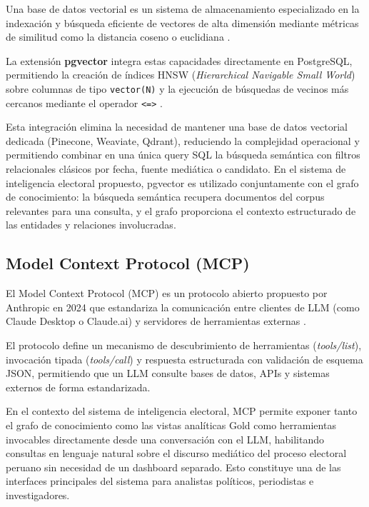 Una base de datos vectorial es un sistema de almacenamiento especializado en la indexación y búsqueda eficiente de vectores de alta dimensión mediante métricas de similitud como la distancia coseno o euclidiana \parencite{tec_pan2024vectordb}.

La extensión \textbf{pgvector} integra estas capacidades directamente en PostgreSQL, permitiendo la creación de índices HNSW (\textit{Hierarchical Navigable Small World}) sobre columnas de tipo \texttt{vector(N)} y la ejecución de búsquedas de vecinos más cercanos mediante el operador \texttt{<=>} \parencite{tec_pgvector2024}.

Esta integración elimina la necesidad de mantener una base de datos vectorial dedicada (Pinecone, Weaviate, Qdrant), reduciendo la complejidad operacional y permitiendo combinar en una única query SQL la búsqueda semántica con filtros relacionales clásicos por fecha, fuente mediática o candidato. En el sistema de inteligencia electoral propuesto, pgvector es utilizado conjuntamente con el grafo de conocimiento: la búsqueda semántica recupera documentos del corpus relevantes para una consulta, y el grafo proporciona el contexto estructurado de las entidades y relaciones involucradas.

\subsection{Model Context Protocol (MCP)}

El Model Context Protocol (MCP) es un protocolo abierto propuesto por Anthropic en 2024 que estandariza la comunicación entre clientes de LLM (como Claude Desktop o Claude.ai) y servidores de herramientas externas \parencite{tec_anthropic2024mcp}.

El protocolo define un mecanismo de descubrimiento de herramientas (\textit{tools/list}), invocación tipada (\textit{tools/call}) y respuesta estructurada con validación de esquema JSON, permitiendo que un LLM consulte bases de datos, APIs y sistemas externos de forma estandarizada.

En el contexto del sistema de inteligencia electoral, MCP permite exponer tanto el grafo de conocimiento como las vistas analíticas Gold como herramientas invocables directamente desde una conversación con el LLM, habilitando consultas en lenguaje natural sobre el discurso mediático del proceso electoral peruano sin necesidad de un dashboard separado. Esto constituye una de las interfaces principales del sistema para analistas políticos, periodistas e investigadores.

